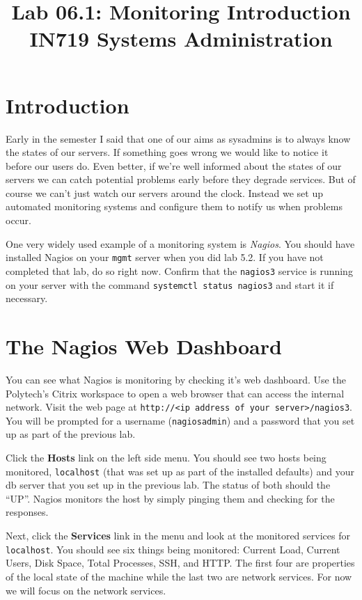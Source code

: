 \documentclass{article}   	%
\title{Lab 06.1: Monitoring Introduction \\ IN719 Systems Administration}
\date{}							%
\begin{document}
\maketitle

\section*{Introduction}
Early in the semester I said that one of our aims as sysadmins is to always know the states of our servers. If something goes wrong we would like to notice it before our users do. Even better, if we're well informed about the states of our servers we can catch potential problems early before they degrade services. But of course we can't just watch our servers around the clock. Instead we set up automated monitoring systems and configure them to notify us when problems occur.

One very widely used example of a monitoring system is \emph{Nagios}. You should have installed Nagios on your \texttt{mgmt} server when you did lab 5.2. If you have not completed that lab, do so right now. Confirm that the \texttt{nagios3} service is running on your server with the command \texttt{systemctl status nagios3} and start it if necessary. 


\section{The Nagios Web Dashboard}
You can see what Nagios is monitoring by checking it's web dashboard. Use the Polytech's Citrix workspace to open a web browser that can access the internal network. Visit the web page at \texttt{http://<ip address of your server>/nagios3}. You will be prompted for a username (\texttt{nagiosadmin}) and a password that you set up as part of the previous lab. 

Click the \textbf{Hosts} link on the left side menu. You should see two hosts being monitored, \texttt{localhost} (that was set up as part of the installed defaults) and your db server that you set up in the previous lab. The status of both should the ``UP''. Nagios monitors the host by simply pinging them and checking for the responses.

Next, click the \textbf{Services} link in the menu and look at the monitored services for \texttt{localhost}. You should see six things being monitored: Current Load, Current Users, Disk Space, Total Processes, SSH, and HTTP. The first four are properties of the local state of the machine while the last two are network services. For now we will focus on the network services.
\end{document}
